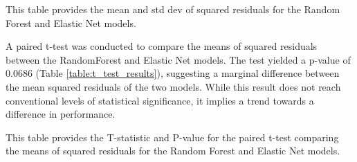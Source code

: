 \documentclass[11pt]{article}
\begin{document}
\begin{table}[h]
\caption{Mean and Standard Deviation of Squared residuals of the Random Forest model and the Elastic Net model}
\label{table:rf_en_residuals}
\begin{threeparttable}
\renewcommand{\TPTminimum}{\linewidth}
\begin{tablenotes}
\footnotesize
\item This table provides the mean and std dev of squared residuals for the Random Forest and Elastic Net models.
\end{tablenotes}
\end{threeparttable}
\end{table}


A paired t-test was conducted to compare the means of squared residuals between the RandomForest and Elastic Net models. The test yielded a p-value of 0.0686 (Table \ref{table:t_test_results}), suggesting a marginal difference between the mean squared residuals of the two models. While this result does not reach conventional levels of statistical significance, it implies a trend towards a difference in performance.

\begin{table}[h]
\caption{Paired t-test results between means of Random Forest and Elastic Net squared residuals}
\label{table:t_test_results}
\begin{threeparttable}
\renewcommand{\TPTminimum}{\linewidth}
\begin{tablenotes}
\footnotesize
\item This table provides the T-statistic and P-value for the paired t-test comparing the means of squared residuals for the Random Forest and Elastic Net models.
\end{tablenotes}
\end{threeparttable}
\end{table}
\end{document}

